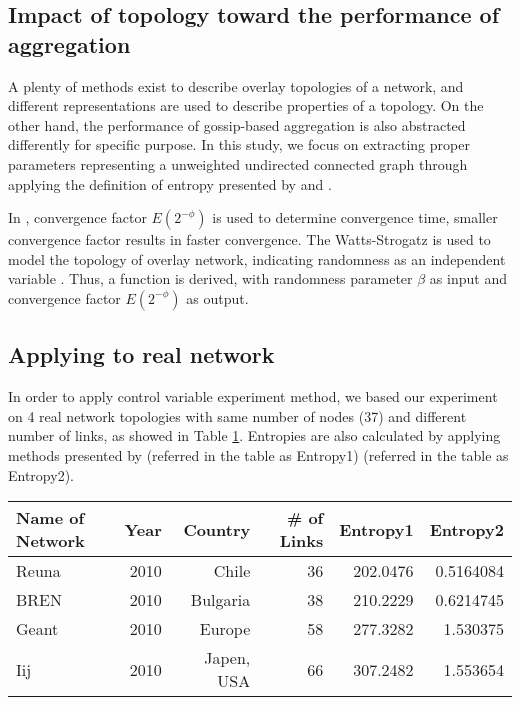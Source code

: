 \documentclass[11pt,a4paper]{article}
\begin{document}
\subsection{Impact of topology toward the performance of aggregation}
A plenty of methods exist to describe overlay topologies of a network, and different representations are used to describe properties of a topology. On the other hand, the performance of gossip-based aggregation is also abstracted differently for specific purpose.
In this study, we focus on extracting proper parameters representing a unweighted undirected connected graph through applying the definition of entropy presented by \cite{entropy1} and \cite{entropy2}.

In \cite{jelasity_gossip-based_2005}, convergence factor $E(2^{-\phi})$ is used to determine convergence time, smaller convergence factor results in faster convergence. The Watts-Strogatz is used to model the topology of overlay network, indicating randomness as an independent variable \cite{Watts1998}. Thus, a function is derived, with randomness parameter $\beta$ as input and convergence factor $E(2^{-\phi})$ as output.

\subsection{Applying to real network}
In order to apply control variable experiment method, we based our experiment on 4 real network topologies with same number of nodes (37) and different number of links, as showed in Table \ref{table: network}. Entropies are also calculated by applying methods presented by \cite{entropy1} (referred in the table as Entropy1) \cite{entropy2} (referred in the table as Entropy2).
\begin{table}
\centering
\begin{tabular}{lrrrrr}
	\hline
	Name of Network & Year & Country & \# of Links & Entropy1 & Entropy2\\
    \hline
    Reuna & 2010 & Chile & 36 & 202.0476 & 0.5164084\\
    BREN & 2010 & Bulgaria & 38 & 210.2229 & 0.6214745\\
    Geant & 2010 & Europe & 58 & 277.3282 & 1.530375\\
    Iij & 2010 & Japen, USA & 66 & 307.2482 & 1.553654\\
    \hline
\end{tabular}
\label{table: network}
\end{table}

\end{document}
